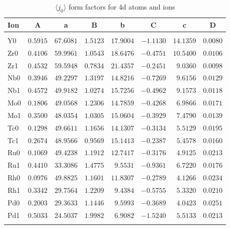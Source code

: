\begin{table}[H]
\caption{
$\langle j_0\rangle$ form factors for 4d atoms and ions}\vspace{2mm}
\label{4dj0}
{\tablesize
\begin{tabular}{lrrrrrrr}
\hline
Ion&
\multicolumn{1}{c}{A}&\multicolumn{1}{c}{a}&
\multicolumn{1}{c}{B}&\multicolumn{1}{c}{b}&
\multicolumn{1}{c}{C}&\multicolumn{1}{c}{c}&\multicolumn{1}{c}{D}\\
\hline\\[-2ex]
Y0 &$0.5915$ &$67.6081$ &$1.5123$ &$17.9004$ &$-1.1130$ &$14.1359$ &$0.0080$ \\
Zr0 &$0.4106$ &$59.9961$ &$1.0543$ &$18.6476$ &$-0.4751$ &$10.5400$ &$0.0106$ \\
Zr1 &$0.4532$ &$59.5948$ &$0.7834$ &$21.4357$ &$-0.2451$ &$9.0360$ &$0.0098$ \\
Nb0 &$0.3946$ &$49.2297$ &$1.3197$ &$14.8216$ &$-0.7269$ &$9.6156$ &$0.0129$ \\
Nb1 &$0.4572$ &$49.9182$ &$1.0274$ &$15.7256$ &$-0.4962$ &$9.1573$ &$0.0118$ \\
Mo0 &$0.1806$ &$49.0568$ &$1.2306$ &$14.7859$ &$-0.4268$ &$6.9866$ &$0.0171$ \\
Mo1 &$0.3500$ &$48.0354$ &$1.0305$ &$15.0604$ &$-0.3929$ &$7.4790$ &$0.0139$ \\
Tc0 &$0.1298$ &$49.6611$ &$1.1656$ &$14.1307$ &$-0.3134$ &$5.5129$ &$0.0195$ \\
Tc1 &$0.2674$ &$48.9566$ &$0.9569$ &$15.1413$ &$-0.2387$ &$5.4578$ &$0.0160$ \\
Ru0 &$0.1069$ &$49.4238$ &$1.1912$ &$12.7417$ &$-0.3176$ &$4.9125$ &$0.0213$ \\
Ru1 &$0.4410$ &$33.3086$ &$1.4775$ &$9.5531$ &$-0.9361$ &$6.7220$ &$0.0176$ \\
Rh0 &$0.0976$ &$49.8825$ &$1.1601$ &$11.8307$ &$-0.2789$ &$4.1266$ &$0.0234$ \\
Rh1 &$0.3342$ &$29.7564$ &$1.2209$ &$9.4384$ &$-0.5755$ &$5.3320$ &$0.0210$ \\
Pd0 &$0.2003$ &$29.3633$ &$1.1446$ &$9.5993$ &$-0.3689$ &$4.0423$ &$0.0251$ \\
Pd1 &$0.5033$ &$24.5037$ &$1.9982$ &$6.9082$ &$-1.5240$ &$5.5133$ &$0.0213$ \\
\hline\\[-2ex]
\end{tabular}
}
\end{table}
